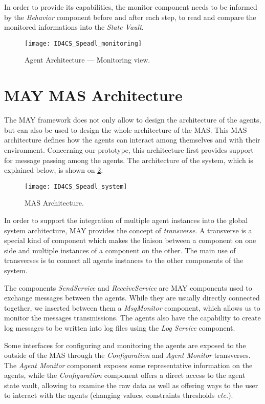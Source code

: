 In order to provide its capabilities, the monitor component needs to be informed by the \emph{Behavior} component before and after each step, to read and compare the monitored informations into the \emph{State Vault}.

\begin{figure}
\centering
\texttt{[image: ID4CS\_Speadl\_monitoring]}
\caption{Agent Architecture --- Monitoring view.}
\label{Arch-monitor}
\end{figure}

\section{MAY MAS Architecture}

The MAY framework does not only allow to design the architecture of the agents, but can also be used to design the whole architecture of the MAS. This MAS architecture defines how the agents can interact among themselves and with their environment. Concerning our prototype, this architecture first provides support for message passing among the agents. The architecture of the system, which is explained below, is shown on \figurename{} \ref{Arch-MAS}.

\begin{figure}
\texttt{[image: ID4CS\_Speadl\_system]}
\caption{MAS Architecture.}\label{Arch-MAS}
\end{figure}

In order to support the integration of multiple agent instances into the global system architecture, MAY provides the concept of \emph{transverse}. A transverse is a special kind of component which makes the liaison between a component on one side and multiple instances of a component on the other. The main use of transverses is to connect all agents instances to the other components of the system.

The components \emph{SendService} and \emph{ReceiveService} are MAY components used to exchange messages between the agents. While they are usually directly connected together, we inserted between them a \emph{MsgMonitor} component, which allows us to monitor the messages transmissions. The agents also have the capability to create log messages to be written into log files using the \emph{Log Service} component.

Some interfaces for configuring and monitoring the agents are exposed to the outside of the MAS through the \emph{Configuration} and \emph{Agent Monitor} transverses. The \emph{Agent Monitor} component exposes some representative information on the agents, while the \emph{Configuration} component offers a direct access to the agent state vault, allowing to examine the raw data as well as offering ways to the user to interact with the agents (changing values, constraints thresholds \emph{etc.}).

